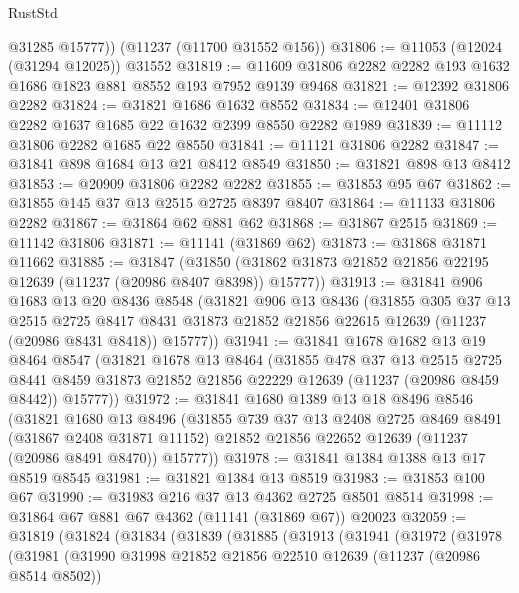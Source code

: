 \begin{lexlean}{RustStd}
\begin{coremodule}
        @31285
        @15777))
    (@11237 (@11700 @31552 @156))
@31806 := @11053 (@12024 (@31294 @12025)) @31552
@31819 := @11609 @31806 @2282 @2282 @193 @1632 @1686 @1823 @881 @8552 @193 @7952 @9139 @9468
@31821 := @12392 @31806 @2282
@31824 := @31821 @1686 @1632 @8552
@31834 := @12401 @31806 @2282 @1637 @1685 @22 @1632 @2399 @8550 @2282 @1989
@31839 := @11112 @31806 @2282 @1685 @22 @8550
@31841 := @11121 @31806 @2282
@31847 := @31841 @898 @1684 @13 @21 @8412 @8549
@31850 := @31821 @898 @13 @8412
@31853 := @20909 @31806 @2282 @2282
@31855 := @31853 @95 @67
@31862 := @31855 @145 @37 @13 @2515 @2725 @8397 @8407
@31864 := @11133 @31806 @2282
@31867 := @31864 @62 @881 @62
@31868 := @31867 @2515
@31869 := @11142 @31806
@31871 := @11141 (@31869 @62)
@31873 := @31868 @31871 @11662
@31885 := @31847
    (@31850 (@31862 @31873 @21852 @21856 @22195 @12639 (@11237 (@20986 @8407 @8398)) @15777))
@31913 := @31841
    @906
    @1683
    @13
    @20
    @8436
    @8548
    (@31821
      @906
      @13
      @8436
      (@31855
        @305
        @37
        @13
        @2515
        @2725
        @8417
        @8431
        @31873
        @21852
        @21856
        @22615
        @12639
        (@11237 (@20986 @8431 @8418))
        @15777))
@31941 := @31841
    @1678
    @1682
    @13
    @19
    @8464
    @8547
    (@31821
      @1678
      @13
      @8464
      (@31855
        @478
        @37
        @13
        @2515
        @2725
        @8441
        @8459
        @31873
        @21852
        @21856
        @22229
        @12639
        (@11237 (@20986 @8459 @8442))
        @15777))
@31972 := @31841
    @1680
    @1389
    @13
    @18
    @8496
    @8546
    (@31821
      @1680
      @13
      @8496
      (@31855
        @739
        @37
        @13
        @2408
        @2725
        @8469
        @8491
        (@31867 @2408 @31871 @11152)
        @21852
        @21856
        @22652
        @12639
        (@11237 (@20986 @8491 @8470))
        @15777))
@31978 := @31841 @1384 @1388 @13 @17 @8519 @8545
@31981 := @31821 @1384 @13 @8519
@31983 := @31853 @100 @67
@31990 := @31983 @216 @37 @13 @4362 @2725 @8501 @8514
@31998 := @31864 @67 @881 @67 @4362 (@11141 (@31869 @67)) @20023
@32059 := @31819
    (@31824
      (@31834
        (@31839
          (@31885
            (@31913
              (@31941
                (@31972
                  (@31978
                    (@31981
                      (@31990
                        @31998
                        @21852
                        @21856
                        @22510
                        @12639
                        (@11237 (@20986 @8514 @8502))

\end{coremodule}
\end{lexlean}
